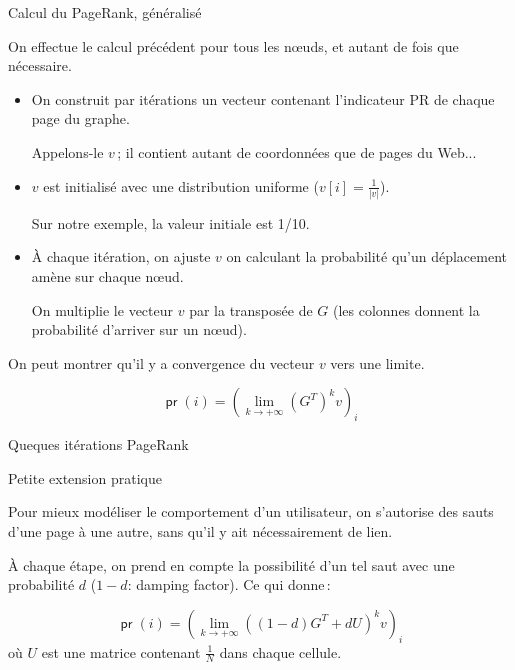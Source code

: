 \begin{frame}{Calcul du PageRank, généralisé}

On effectue le calcul précédent pour tous les n{\oe}uds, et autant de fois que nécessaire.
\begin{itemize}
  \item On construit par itérations un vecteur contenant l'indicateur PR de chaque page du  graphe.

     Appelons-le $v$\,; il contient autant de coordonnées que de pages du Web...
     
     \item $v$ est initialisé avec une distribution uniforme  ($v[i] = \frac{1}{|v|}$).

   Sur notre exemple, la valeur initiale est 1/10.

  \item À chaque itération, on ajuste $v$ on calculant la probabilité qu'un
  déplacement amène sur chaque n{\oe}ud.
  
  
   On multiplie le vecteur $v$ par la \alert{transposée} de $G$ (les colonnes
      donnent la probabilité d'\alert{arriver} sur un n{\oe}ud).

\end{itemize}


   On peut montrer qu'il y a \alert{convergence} du vecteur $v$ vers une limite.
   
   
\[\mathop{\mathsf{pr}}(i)=\left(\lim_{k\rightarrow+\infty}(G^T)^kv\right)_i \]

\end{frame}



\begin{frame}{Queques itérations PageRank}
\end{frame}

\begin{frame}{Petite extension pratique}

Pour mieux modéliser le comportement d'un utilisateur, on s'autorise des
\alert{sauts} d'une page à une autre, sans qu'il y ait nécessairement de lien.

\vfill

À chaque étape, on prend en compte la possibilité d'un tel saut avec
une probabilité  $d$ ($1-d$: \alert{damping factor}). Ce qui donne\,:

\[
\mathop{\mathsf{pr}}(i)=\left(\lim_{k\rightarrow+\infty}((1-d)G^T+dU)^kv\right)_i
\] où $U$ est une matrice contenant $\frac{1}{N}$ dans chaque cellule.

\end{frame}

